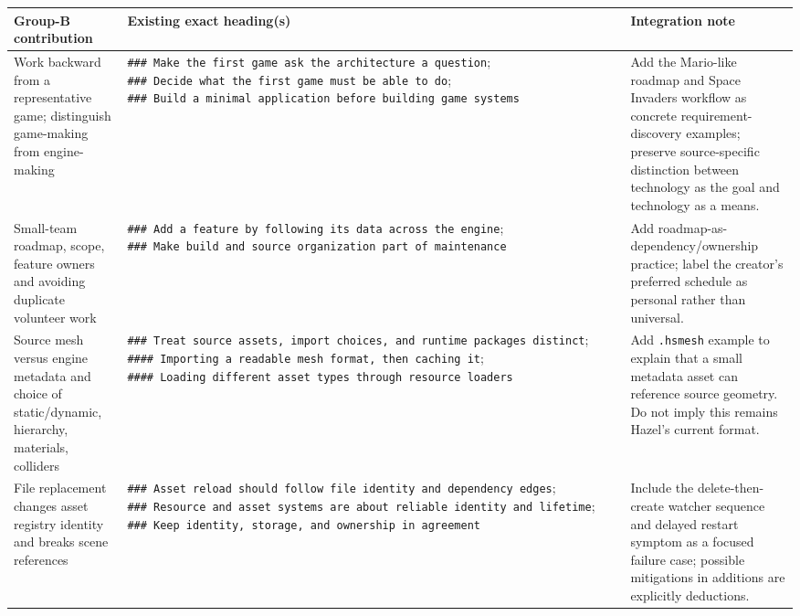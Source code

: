 {\def\LTcaptype{none} %
\begin{longtable}[]{@{}
  >{\raggedright\arraybackslash}p{}
  >{\raggedright\arraybackslash}p{}
  >{\raggedright\arraybackslash}p{}@{}}
\toprule\noalign{}
\begin{minipage}[b]{\linewidth}\raggedright
Group-B contribution
\end{minipage} & \begin{minipage}[b]{\linewidth}\raggedright
Existing exact heading(s)
\end{minipage} & \begin{minipage}[b]{\linewidth}\raggedright
Integration note
\end{minipage} \\
\midrule\noalign{}
\endhead
\bottomrule\noalign{}
\endlastfoot
Work backward from a representative game; distinguish game-making from engine-making & \texttt{\#\#\#\ Make\ the\ first\ game\ ask\ the\ architecture\ a\ question}; \texttt{\#\#\#\ Decide\ what\ the\ first\ game\ must\ be\ able\ to\ do}; \texttt{\#\#\#\ Build\ a\ minimal\ application\ before\ building\ game\ systems} & Add the Mario-like roadmap and Space Invaders workflow as concrete requirement-discovery examples; preserve source-specific distinction between technology as the goal and technology as a means. \\
Small-team roadmap, scope, feature owners and avoiding duplicate volunteer work & \texttt{\#\#\#\ Add\ a\ feature\ by\ following\ its\ data\ across\ the\ engine}; \texttt{\#\#\#\ Make\ build\ and\ source\ organization\ part\ of\ maintenance} & Add roadmap-as-dependency/ownership practice; label the creator's preferred schedule as personal rather than universal. \\
Source mesh versus engine metadata and choice of static/dynamic, hierarchy, materials, colliders & \texttt{\#\#\#\ Treat\ source\ assets,\ import\ choices,\ and\ runtime\ packages\ distinct}; \texttt{\#\#\#\#\ Importing\ a\ readable\ mesh\ format,\ then\ caching\ it}; \texttt{\#\#\#\#\ Loading\ different\ asset\ types\ through\ resource\ loaders} & Add \texttt{.hsmesh} example to explain that a small metadata asset can reference source geometry. Do not imply this remains Hazel's current format. \\
File replacement changes asset registry identity and breaks scene references & \texttt{\#\#\#\ Asset\ reload\ should\ follow\ file\ identity\ and\ dependency\ edges}; \texttt{\#\#\#\ Resource\ and\ asset\ systems\ are\ about\ reliable\ identity\ and\ lifetime}; \texttt{\#\#\#\ Keep\ identity,\ storage,\ and\ ownership\ in\ agreement} & Include the delete-then-create watcher sequence and delayed restart symptom as a focused failure case; possible mitigations in additions are explicitly deductions. \\

\end{longtable}}
